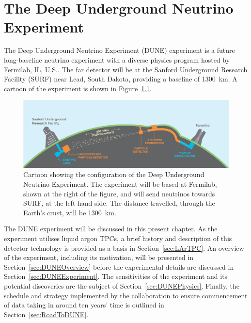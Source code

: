 
\graphicspath{{DUNE/Figs/}}

\chapter{The Deep Underground Neutrino Experiment}\label{chap:DUNE}

The Deep Underground Neutrino Experiment (DUNE) experiment \cite{DUNECDR1,DUNECDR2,DUNECDR3,DUNECDR4} is a future long-baseline neutrino experiment with a diverse physics program hosted by Fermilab, IL, U.S..  The far detector will be at the Sanford Underground Research Facility (SURF) near Lead, South Dakota, providing a baseline of 1300~km.  A cartoon of the experiment is shown in Figure~\ref{fig:DUNE}.

\begin{figure}
  \centering
  \includegraphics[width=14cm]{DUNE.jpg}
  \caption[Cartoon showing the configuration of the Deep Underground Neutrino Experiment.]{Cartoon showing the configuration of the Deep Underground Neutrino Experiment.  The experiment will be based at Fermilab, shown at the right of the figure, and will send neutrinos towards SURF, at the left hand side.  The distance travelled, through the Earth's crust, will be 1300~km.}
  \label{fig:DUNE}
\end{figure}

The DUNE experiment will be discussed in this present chapter.  As the experiment utilises liquid argon TPCs, a brief history and description of this detector technology is provided as a basis in Section~\ref{sec:LArTPC}.  An overview of the experiment, including its motivation, will be presented in Section~\ref{sec:DUNEOverview} before the experimental details are discussed in Section~\ref{sec:DUNEExperiment}.  The sensitivities of the experiment and its potential discoveries are the subject of Section~\ref{sec:DUNEPhysics}.  Finally, the schedule and strategy implemented by the collaboration to ensure commencement of data taking in around ten years' time is outlined in Section~\ref{sec:RoadToDUNE}.

